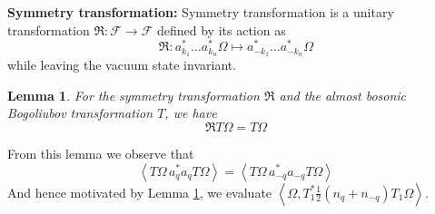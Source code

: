\documentclass[sn-mathphys,Numbered, a4paper ,nocrop]{sn-jnl}%
\newcommand{\half}{\frac{1}{2}}
\newcommand{\eva}[1]{\left\langle #1 \right\rangle}
\theoremstyle{plain}
\newtheorem{lemma}[theorem]{Lemma}
\theoremstyle{definition}
\theoremstyle{remark}
\theoremstyle{plain}
\theoremstyle{definition}
\theoremstyle{remark}
\begin{document}
\textbf{Symmetry transformation:} Symmetry transformation is a unitary transformation $\mathfrak{R}:\mathcal{F}\rightarrow \mathcal{F}$ defined by its action as
\begin{equation}
    \mathfrak{R}: a^*_{k_1}\ldots a^*_{k_n}\Omega \mapsto a^*_{-k_1}\ldots a^*_{-k_n}\Omega 
\end{equation}
while leaving the vacuum state invariant.\newline

\begin{lemma}\label{lem:symtransformation}
    For the symmetry transformation $\mathfrak{R}$ and the almost bosonic Bogoliubov transformation $T$, we have
    \begin{equation}
        \mathfrak{R}T\Omega = T\Omega
    \end{equation}
\end{lemma}
From this lemma we observe that 
\begin{equation}
    \eva{T\Omega\, a^*_qa_qT\Omega} = \eva{T\Omega\, a^*_{-q}a_{-q}T\Omega}
\end{equation}
And hence motivated by Lemma \ref{lem:symtransformation}, we evaluate $\eva{\Omega, T_1^*\half\left(n_q+n_{-q}\right)T_1\Omega}$.\newline 
\end{document}

